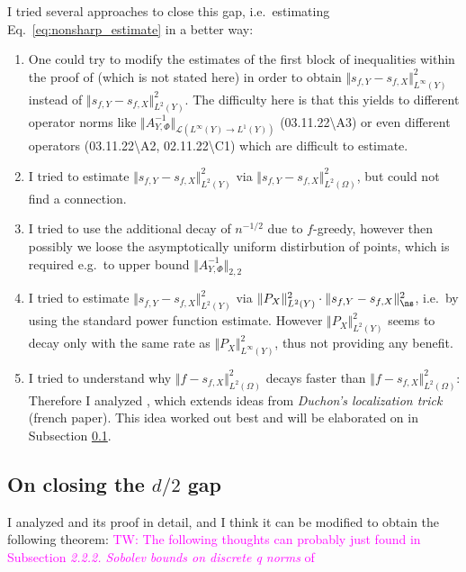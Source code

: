 \documentclass[a4paper, 10pt]{article}
\newcommand{\tw}[1]{\textcolor{magenta}{TW: #1}}
\begin{document}
\noindent I tried several approaches to close this gap, i.e.\ estimating Eq.\ \eqref{eq:nonsharp_estimate} in a better way:
\begin{enumerate}
\item One could try to modify the estimates of the first block of inequalities within the proof of \cite[Theorem 6.1]{schaback2002inverse} (which is not stated here) in order to obtain $\Vert s_{f, Y} - s_{f, X} \Vert_{L^\infty(Y)}^2$ instead of $\Vert s_{f, Y} - s_{f, X} \Vert_{L^2(Y)}^2$.
The difficulty here is that this yields to different operator norms like $\Vert A_{Y, \Phi}^{-1} \Vert_{\mathcal{L}(L^\infty(Y) \rightarrow L^1(Y))}$ (03.11.22\textbackslash A3) or even different operators (03.11.22\textbackslash A2, 02.11.22\textbackslash C1) which are difficult to estimate.
\item I tried to estimate $\Vert s_{f, Y} - s_{f, X} \Vert_{L^2(Y)}^2$ via $\Vert s_{f, Y} - s_{f, X} \Vert_{L^2(\Omega)}^2$, but could not find a connection.
\item I tried to use the additional decay of $n^{-1/2}$ due to $f$-greedy, however then possibly we loose the asymptotically uniform distirbution of points, which is required e.g.\ to upper bound $\Vert A_{Y, \Phi}^{-1} \Vert_{2,2}$
\item I tried to estimate $\Vert s_{f, Y} - s_{f, X} \Vert_{L^2(Y)}^2$ via $\Vert P_X \Vert_{L^2(Y)}^2 \cdot \Vert s_{f, Y} - s_{f, X} \Vert_{\ns}^2$, i.e.\ by using the standard power function estimate. 
However $\Vert P_X \Vert_{L^2(Y)}^2$ seems to decay only with the same rate as $\Vert P_X \Vert_{L^\infty(Y)}^2$, thus not providing any benefit.
\item I tried to understand why $\Vert f - s_{f, X} \Vert_{L^2(\Omega)}^2$ decays faster than $\Vert f - s_{f, X} \Vert_{L^2(\Omega)}^2$: 
Therefore I analyzed \cite[Theorem 5]{wendland1997sobolev}, which extends ideas from \textit{Duchon's localization trick} \cite{duchon1978erreur} (french paper). 
This idea worked out best and will be elaborated on in Subsection \ref{subsec:on_closing_the_gap}.
\end{enumerate}


\subsection{On closing the $d/2$ gap} \label{subsec:on_closing_the_gap}

I analyzed \cite[Theorem 5]{wendland1997sobolev} and its proof in detail, and I think it can be modified to obtain the following theorem:
\tw{The following thoughts can probably just found in Subsection \textit{2.2.2. Sobolev bounds on discrete q norms} of \cite{narcowich2005sobolev}}
\end{document}

